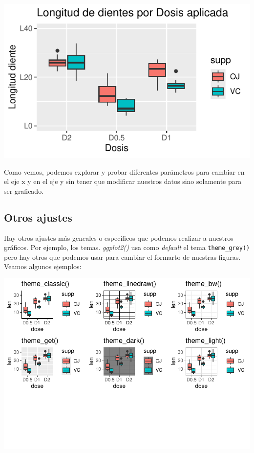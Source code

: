 \documentclass[
]{book}
\begin{document}
\begin{center}\includegraphics{_main_files/figure-latex/unnamed-chunk-217-1} \end{center}

Como vemos, podemos explorar y probar diferentes parámetros para cambiar en el eje x y en el eje y sin tener que modificar nuestros datos sino solamente para ser graficado.

\subsection{Otros ajustes}\label{otros-ajustes}

Hay otros ajustes más geneales o específicos que podemos realizar a nuestros gráficos.
Por ejemplo, los temas.
\emph{ggplot2()} usa como \emph{default} el tema \texttt{theme\_grey()} pero hay otros que podemos usar para cambiar el formarto de nuestras figuras.
Veamos algunos ejemplos:

\includegraphics{_main_files/figure-latex/unnamed-chunk-218-1.pdf}
\end{document}

